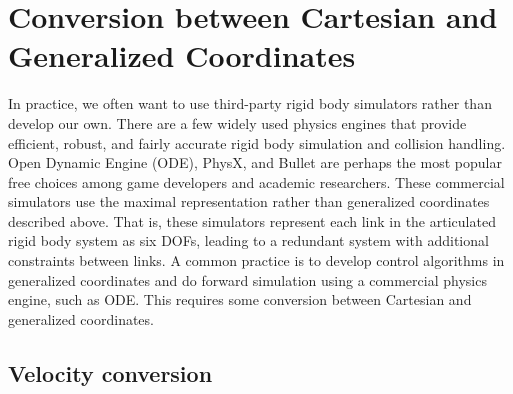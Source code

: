 \section{Conversion between Cartesian and Generalized Coordinates}
In practice, we often want to use third-party rigid body simulators
rather than develop our own. There are a few widely used physics
engines that provide efficient, robust, and fairly accurate rigid body
simulation and collision handling. Open Dynamic Engine (ODE), PhysX, and
Bullet are perhaps the most popular free choices among game developers and
academic researchers. These commercial simulators use the maximal
representation rather than generalized coordinates
described above. That is, these simulators represent each link in the
articulated rigid body system as six DOFs,
leading to a redundant system with additional constraints between
links. A common practice is to develop control algorithms in
generalized coordinates and do forward simulation using a commercial
physics engine, such as ODE. This requires some conversion between
Cartesian and generalized coordinates.


\subsection{Velocity conversion}

